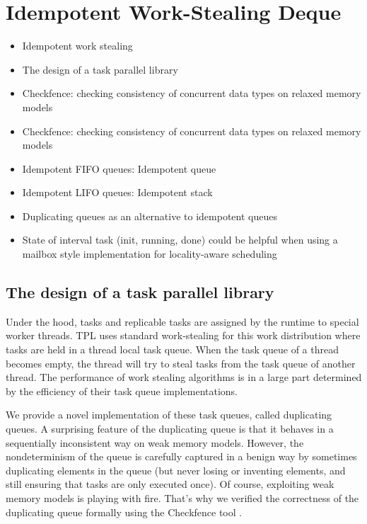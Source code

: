 \section{Idempotent Work-Stealing Deque}
\label{sec:queues-implementation-idempotent-ws-deque}



\begin{itemize}
\item Idempotent work stealing \cite{Michael2009}
\item The design of a task parallel library \cite{Leijen2009}
\item Checkfence: checking consistency of concurrent data types on
  relaxed memory models \cite{Burckhardt2007}
\item Checkfence: checking consistency of concurrent data types on
  relaxed memory models \cite{Burckhardt2007a}
\end{itemize}


\begin{itemize}
\item Idempotent FIFO queues: Idempotent queue
\item Idempotent LIFO queues: Idempotent stack
\item Duplicating queues as an alternative to idempotent queues
\item State of interval task (init, running, done) could be helpful
  when using a mailbox style implementation for locality-aware
  scheduling \cite{Acar2002}
\end{itemize}

\subsection{The design of a task parallel library \cite{Leijen2009}}

Under the hood, tasks and replicable tasks are assigned by the runtime
to special worker threads. TPL uses standard work-stealing for this
work distribution \cite{Frigo1998} where tasks are held in a thread
local task queue. When the task queue of a thread becomes empty, the
thread will try to steal tasks from the task queue of another
thread. The performance of work stealing algorithms is in a large part
determined by the efficiency of their task queue implementations.

We provide a novel implementation of these task queues, called
duplicating queues. A surprising feature of the duplicating queue is
that it behaves in a sequentially inconsistent way on weak memory
models. However, the nondeterminism of the queue is carefully captured
in a benign way by sometimes duplicating elements in the queue (but
never losing or inventing elements, and still ensuring that tasks are
only executed once). Of course, exploiting weak memory models is
playing with fire. That's why we verified the correctness of the
duplicating queue formally using the Checkfence tool
\cite{Burckhardt2007, Burckhardt2007a}.

